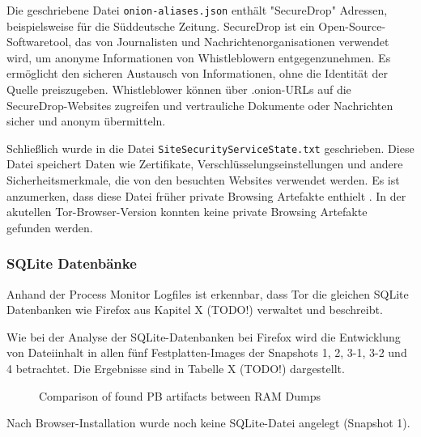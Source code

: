 \begin{appendices}
Die geschriebene Datei \texttt{onion-aliases.json} enthält "SecureDrop" Adressen, beispielsweise für die Süddeutsche Zeitung.  %
SecureDrop ist ein Open-Source-Softwaretool, das von Journalisten und Nachrichtenorganisationen verwendet wird, um anonyme Informationen von Whistleblowern entgegenzunehmen. Es ermöglicht den sicheren Austausch von Informationen, ohne die Identität der Quelle preiszugeben. Whistleblower können über .onion-URLs auf die SecureDrop-Websites zugreifen und vertrauliche Dokumente oder Nachrichten sicher und anonym übermitteln.


Schließlich wurde in die Datei \texttt{SiteSecurityServiceState.txt} geschrieben.
Diese Datei speichert Daten wie Zertifikate, Verschlüsselungseinstellungen und andere Sicherheitsmerkmale, die von den besuchten Websites verwendet werden.
Es ist anzumerken, dass diese Datei früher private Browsing Artefakte enthielt %
. In der akutellen Tor-Browser-Version konnten keine private Browsing Artefakte gefunden werden.
	
\subsubsection*{SQLite Datenbänke} 
Anhand der Process Monitor Logfiles ist erkennbar, dass Tor die gleichen SQLite Datenbanken wie Firefox aus Kapitel X (TODO!) verwaltet und beschreibt.
			
Wie bei der Analyse der SQLite-Datenbanken bei Firefox wird die Entwicklung von Dateiinhalt in allen fünf Festplatten-Images der Snapshots 1, 2, 3-1, 3-2 und 4 betrachtet. Die Ergebnisse sind in Tabelle X (TODO!) dargestellt.
\begin{figure}[h!]
	\centerline{}
	\label{chart:final-criteria}  
	\caption{Comparison of found PB artifacts between RAM Dumps}
\end{figure}
Nach Browser-Installation wurde noch keine SQLite-Datei angelegt (Snapshot 1).


\end{appendices}
